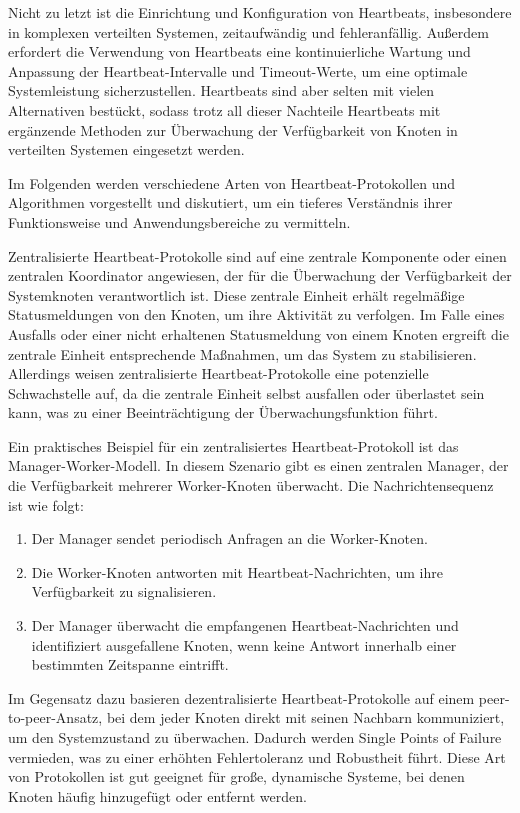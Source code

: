 Nicht zu letzt ist die  Einrichtung und Konfiguration von Heartbeats, insbesondere in komplexen verteilten Systemen, zeitaufwändig und fehleranfällig. Außerdem erfordert die Verwendung von Heartbeats eine kontinuierliche Wartung und Anpassung der Heartbeat-Intervalle und Timeout-Werte, um eine optimale Systemleistung sicherzustellen. 
Heartbeats sind aber selten mit vielen Alternativen bestückt, sodass trotz all dieser Nachteile Heartbeats mit ergänzende Methoden zur Überwachung der Verfügbarkeit von Knoten in verteilten Systemen eingesetzt werden. 

Im Folgenden werden verschiedene Arten von Heartbeat-Protokollen und Algorithmen vorgestellt und diskutiert, um ein tieferes Verständnis ihrer Funktionsweise und Anwendungsbereiche zu vermitteln.

Zentralisierte Heartbeat-Protokolle sind auf eine zentrale Komponente oder einen zentralen Koordinator angewiesen, der für die Überwachung der Verfügbarkeit der Systemknoten verantwortlich ist. Diese zentrale Einheit erhält regelmäßige Statusmeldungen von den Knoten, um ihre Aktivität zu verfolgen. Im Falle eines Ausfalls oder einer nicht erhaltenen Statusmeldung von einem Knoten ergreift die zentrale Einheit entsprechende Maßnahmen, um das System zu stabilisieren. Allerdings weisen zentralisierte Heartbeat-Protokolle eine potenzielle Schwachstelle auf, da die zentrale Einheit selbst ausfallen oder überlastet sein kann, was zu einer Beeinträchtigung der Überwachungsfunktion führt.


Ein praktisches Beispiel für ein zentralisiertes Heartbeat-Protokoll ist das Manager-Worker-Modell. In diesem Szenario gibt es einen zentralen Manager, der die Verfügbarkeit mehrerer Worker-Knoten überwacht. Die Nachrichtensequenz ist wie folgt:
\begin{enumerate}[label=(\alph*)]
\item Der Manager sendet periodisch Anfragen an die Worker-Knoten.
\item Die Worker-Knoten antworten mit Heartbeat-Nachrichten, um ihre Verfügbarkeit zu signalisieren.
\item Der Manager überwacht die empfangenen Heartbeat-Nachrichten und identifiziert ausgefallene Knoten, wenn keine Antwort innerhalb einer bestimmten Zeitspanne eintrifft.
\end{enumerate}

Im Gegensatz dazu basieren dezentralisierte Heartbeat-Protokolle auf einem peer-to-peer-Ansatz, bei dem jeder Knoten direkt mit seinen Nachbarn kommuniziert, um den Systemzustand zu überwachen. Dadurch werden Single Points of Failure vermieden, was zu einer erhöhten Fehlertoleranz und Robustheit führt. Diese Art von Protokollen ist gut geeignet für große, dynamische Systeme, bei denen Knoten häufig hinzugefügt oder entfernt werden.

